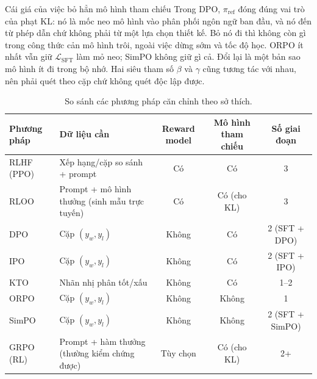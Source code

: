 \begin{pitfall}{Cái giá của việc bỏ hẳn mô hình tham chiếu}
Trong DPO, \( \pi_{\text{ref}} \) đóng đúng vai trò của phạt KL: nó là mốc neo mô hình vào phân phối ngôn ngữ ban đầu, và nó đến từ phép dẫn chứ không phải từ một lựa chọn thiết kế. Bỏ nó đi thì không còn gì trong công thức cản mô hình trôi, ngoài việc dừng sớm và tốc độ học. ORPO ít nhất vẫn giữ \( \mathcal{L}_{\text{SFT}} \) làm mỏ neo; SimPO không giữ gì cả. Đổi lại là một bản sao mô hình ít đi trong bộ nhớ. Hai siêu tham số \( \beta \) và \( \gamma \) cũng tương tác với nhau, nên phải quét theo cặp chứ không quét độc lập được.
\end{pitfall}

\begin{table}[H]
\centering
\caption{So sánh các phương pháp căn chỉnh theo sở thích.}
\label{tab:alignment_methods_comparison}
\begin{tabularx}{\textwidth}{@{}lXccc@{}}
\toprule
\textbf{Phương pháp} & \textbf{Dữ liệu cần} & \textbf{Reward model} & \textbf{Mô hình tham chiếu} & \textbf{Số giai đoạn} \\
\midrule
RLHF (PPO) & Xếp hạng/cặp so sánh + prompt & Có & Có & 3 \\
RLOO & Prompt + mô hình thưởng (sinh mẫu trực tuyến) & Có & Có (cho KL) & 3 \\
DPO & Cặp $(y_w, y_l)$ & Không & Có & 2 (SFT + DPO) \\
IPO & Cặp $(y_w, y_l)$ & Không & Có & 2 (SFT + IPO) \\
KTO & Nhãn nhị phân tốt/xấu & Không & Có & 1--2 \\
ORPO & Cặp $(y_w, y_l)$ & Không & Không & 1 \\
SimPO & Cặp $(y_w, y_l)$ & Không & Không & 2 (SFT + SimPO) \\
GRPO (RL) & Prompt + hàm thưởng (thường kiểm chứng được) & Tùy chọn & Có (cho KL) & 2+ \\
\bottomrule
\end{tabularx}
\end{table}
